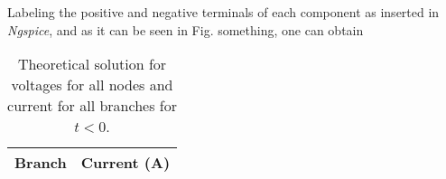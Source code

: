 Labeling the positive and negative terminals of each component as inserted in \textit{Ngspice}, and as it can be seen in Fig. something, one can obtain

\begin{table}[H]
    \begin{minipage}{.5\textwidth}
      
    \end{minipage}
    \begin{minipage}{.5\textwidth}
      \centering
      \begin{tabular}{c|c}
        \hline
          Branch &  Current (A) \\
          \hline
          
          \hline
      \end{tabular}
    \end{minipage}
    \caption{Theoretical solution for voltages for all nodes and current for all branches for $t<0$.}
    \label{tab:current}
\end{table}

